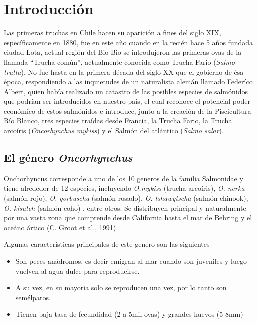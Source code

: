 \documentclass[12pt,a4paper,oneside]{scrbook}
\begin{document}
\clearpage

 \tableofcontents
\clearpage
\cleardoublepage
\listoffigures
\cleardoublepage
\listoftables

\chapter{Introducción}\label{cap.introduccion}

 Las primeras truchas en Chile hacen su aparición
a fines del siglo XIX, específicamente en 1880, fue en este año cuando
en la recién hace 5 años fundada ciudad Lota, actual región del Bio-Bio
se introdujeron las primeras ovas de la llamada ``Trucha común'',
actualmente conocida como Trucha Fario (\emph{Salmo trutta}). No fue
hasta en la primera década del siglo XX que el gobierno de ésa época,
respondiendo a las inquietudes de un naturalista alemán llamado Federíco
Albert, quien había realizado un catastro de las posibles especies de
salmónidos que podrían ser introducidos en nuestro país, el cual
reconoce el potencial poder económico de estos salmónidos e introduce,
junto a la creación de la Piscicultura Río Blanco, tres especies traídas
desde Francia, la Trucha Fario, la Trucha arcoíris (\emph{Oncorhynchus
mykiss}) y el Salmón del atlántico (\emph{Salmo salar}).

\section{El género \emph{Oncorhynchus}}

Onchorhyncus corresponde a uno de los 10 generos de la familia
Salmonidae y tiene alrededor de 12 especies, incluyendo \emph{O.mykiss}
(trucha arcoíris), \emph{O. nerka} (salmón rojo), \emph{O. gorbuscha}
(salmón rosado), \emph{O. tshawytscha} (salmón chinook), \emph{O.
kisutch} (salmón coho) , entre otros. Se distribuyen principal y
naturalmente por una vasta zona que comprende desde California hasta el
mar de Behring y el oceáno ártico (C. Groot et al., 1991).

Algunas características principales de este genero son las siguientes

\begin{itemize}
\itemsep1pt\parskip0pt
\item
  Son peces anádromos, es decir emigran al mar cuando son juveniles y
  luego vuelven al agua dulce para reproducirse.
\item
  A su vez, en su mayoria solo se reproducen una vez, por lo tanto son
  semélparos.
\item
  Tienen baja tasa de fecundidad (2 a 5mil ovas) y grandes huevos
  (5-8mm)
\end{itemize}
\end{document}

